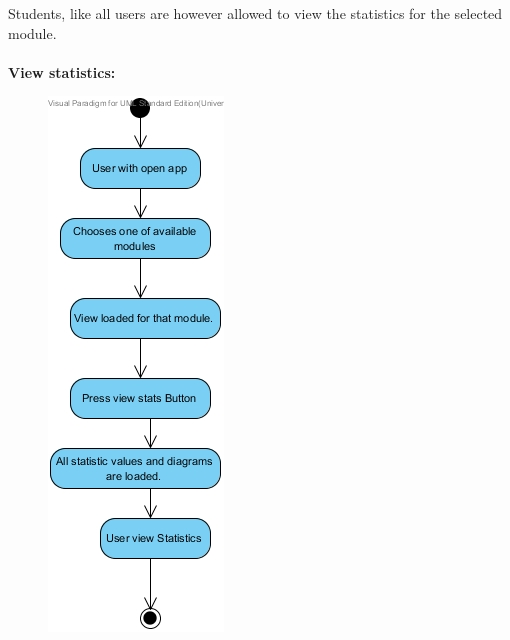 \documentclass[12pt,a4paper]{article}
\begin{document}
Students, like all users are however allowed to view the statistics for the selected module. \\
\\
\textbf {View statistics:}
\begin{figure}[h]
\begin{center}
\includegraphics[scale=0.7]{./AndroidActivityDiagrams/ActivityDiagram3}
\end{center}
\end{figure}  
\end{document}
